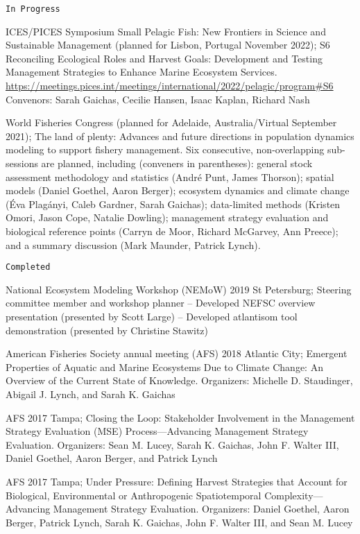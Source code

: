 \documentclass[11pt, a4paper]{awesome-cv}
\begin{document}
\begin{verbatim}
In Progress
\end{verbatim}

ICES/PICES Symposium Small Pelagic Fish: New Frontiers in Science and
Sustainable Management (planned for Lisbon, Portugal November 2022); S6
Reconciling Ecological Roles and Harvest Goals: Development and Testing
Management Strategies to Enhance Marine Ecosystem Services.
\url{https://meetings.pices.int/meetings/international/2022/pelagic/program\#S6}
Convenors: Sarah Gaichas, Cecilie Hansen, Isaac Kaplan, Richard Nash

World Fisheries Congress (planned for Adelaide, Australia/Virtual
September 2021); The land of plenty: Advances and future directions in
population dynamics modeling to support fishery management. Six
consecutive, non-overlapping sub-sessions are planned, including
(conveners in parentheses): general stock assessment methodology and
statistics (André Punt, James Thorson); spatial models (Daniel Goethel,
Aaron Berger); ecosystem dynamics and climate change (Éva Plagányi,
Caleb Gardner, Sarah Gaichas); data-limited methods (Kristen Omori,
Jason Cope, Natalie Dowling); management strategy evaluation and
biological reference points (Carryn de Moor, Richard McGarvey, Ann
Preece); and a summary discussion (Mark Maunder, Patrick Lynch).

\begin{verbatim}
Completed
\end{verbatim}

National Ecosystem Modeling Workshop (NEMoW) 2019 St Petersburg;
Steering committee member and workshop planner -- Developed NEFSC
overview presentation (presented by Scott Large) -- Developed atlantisom
tool demonstration (presented by Christine Stawitz)

American Fisheries Society annual meeting (AFS) 2018 Atlantic City;
Emergent Properties of Aquatic and Marine Ecosystems Due to Climate
Change: An Overview of the Current State of Knowledge. Organizers:
Michelle D. Staudinger, Abigail J. Lynch, and Sarah K. Gaichas

AFS 2017 Tampa; Closing the Loop: Stakeholder Involvement in the
Management Strategy Evaluation (MSE) Process---Advancing Management
Strategy Evaluation. Organizers: Sean M. Lucey, Sarah K. Gaichas, John
F. Walter III, Daniel Goethel, Aaron Berger, and Patrick Lynch

AFS 2017 Tampa; Under Pressure: Defining Harvest Strategies that Account
for Biological, Environmental or Anthropogenic Spatiotemporal
Complexity---Advancing Management Strategy Evaluation. Organizers:
Daniel Goethel, Aaron Berger, Patrick Lynch, Sarah K. Gaichas, John F.
Walter III, and Sean M. Lucey
\end{document}
